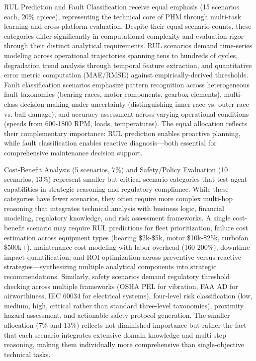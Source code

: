 \documentclass[sigconf, screen, nonacm]{acmart}
\begin{document}
RUL Prediction and Fault Classification receive equal emphasis (15 scenarios each, 20\% apiece), representing the technical core of PHM through multi-task learning and cross-platform evaluation. Despite their equal scenario counts, these categories differ significantly in computational complexity and evaluation rigor through their distinct analytical requirements. RUL scenarios demand time-series modeling across operational trajectories spanning tens to hundreds of cycles, degradation trend analysis through temporal feature extraction, and quantitative error metric computation (MAE/RMSE) against empirically-derived thresholds. Fault classification scenarios emphasize pattern recognition across heterogeneous fault taxonomies (bearing races, motor components, gearbox elements), multi-class decision-making under uncertainty (distinguishing inner race vs. outer race vs. ball damage), and accuracy assessment across varying operational conditions (speeds from 600-1800 RPM, loads, temperatures). The equal allocation reflects their complementary importance: RUL prediction enables proactive planning, while fault classification enables reactive diagnosis—both essential for comprehensive maintenance decision support.

Cost-Benefit Analysis (5 scenarios, 7\%) and Safety/Policy Evaluation (10 scenarios, 13\%) represent smaller but critical scenario categories that test agent capabilities in strategic reasoning and regulatory compliance. While these categories have fewer scenarios, they often require more complex multi-hop reasoning that integrates technical analysis with business logic, financial modeling, regulatory knowledge, and risk assessment frameworks. A single cost-benefit scenario may require RUL predictions for fleet prioritization, failure cost estimation across equipment types (bearing \$2k-\$5k, motor \$10k-\$25k, turbofan \$500k+), maintenance cost modeling with labor overhead (160-200\%), downtime impact quantification, and ROI optimization across preventive versus reactive strategies---synthesizing multiple analytical components into strategic recommendations. Similarly, safety scenarios demand regulatory threshold checking across multiple frameworks (OSHA PEL for vibration, FAA AD for airworthiness, IEC 60034 for electrical systems), four-level risk classification (low, medium, high, critical rather than standard three-level taxonomies), proximity hazard assessment, and actionable safety protocol generation. The smaller allocation (7\% and 13\%) reflects not diminished importance but rather the fact that each scenario integrates extensive domain knowledge and multi-step reasoning, making them individually more comprehensive than single-objective technical tasks.
\end{document}
